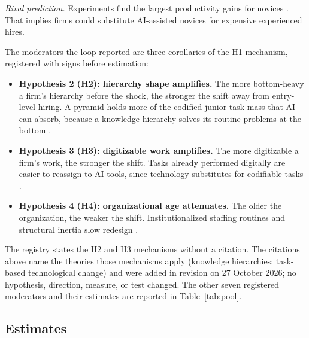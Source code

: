 \documentclass[11pt]{article}
\theoremstyle{remark}\newtheorem{remark}{Remark}
\begin{document}
\emph{Rival prediction.} Experiments find the largest productivity gains for novices
\citep{noy2023experimental,brynjolfsson2025generative,dellacqua2026navigating}. That implies firms could substitute
AI-assisted novices for expensive experienced hires.

The moderators the loop reported are three corollaries of the H1 mechanism, registered with signs before estimation:
\begin{itemize}
\item \textbf{Hypothesis 2 (H2): hierarchy shape amplifies.} The more bottom-heavy a firm's hierarchy before the shock, the
stronger the shift away from entry-level hiring. A pyramid holds more of the codified junior task mass that AI can absorb, because a knowledge hierarchy solves its
routine problems at the bottom \citep{garicano2000hierarchies}.
\item \textbf{Hypothesis 3 (H3): digitizable work amplifies.} The more digitizable a firm's work, the stronger the shift.
Tasks already performed digitally are easier to reassign to AI tools, since technology substitutes for codifiable
tasks \citep{autor2003skill}.
\item \textbf{Hypothesis 4 (H4): organizational age attenuates.} The older the organization, the weaker the shift.
Institutionalized staffing routines and structural inertia slow redesign \citep{hannan1984structural,sorensen2000aging}.
\end{itemize}
The registry states the H2 and H3 mechanisms without a citation. The citations above name the theories those mechanisms
apply (knowledge hierarchies; task-based technological change) and were added in revision on 27 October 2026; no
hypothesis, direction, measure, or test changed. The other seven registered moderators and their estimates are reported in
Table~\ref{tab:pool}.

\subsection{Estimates}




\end{document}
